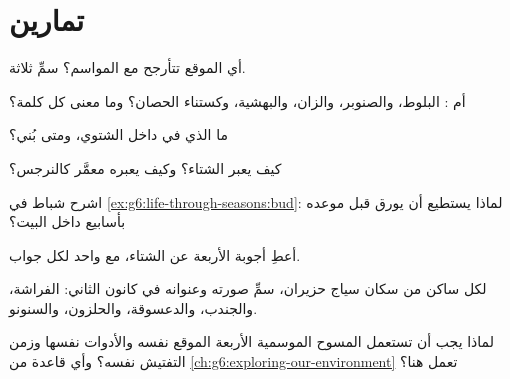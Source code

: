 \section{تمارين}

\begin{exercise}[$\star$]\label{exo:g6:life-through-seasons:1}
أي  الموقع تتأرجح مع المواسم؟ سمِّ ثلاثة.
\end{exercise}

\begin{exercise}[$\star$]\label{exo:g6:life-through-seasons:2}
 أم : البلوط، والصنوبر، والزان، والبهشية، وكستناء
الحصان؟ وما معنى كل كلمة؟
\end{exercise}

\begin{exercise}[$\star$]\label{exo:g6:life-through-seasons:3}
ما الذي في داخل  الشتوي، ومتى بُني؟
\end{exercise}

\begin{exercise}[$\star$]\label{exo:g6:life-through-seasons:4}
كيف يعبر  الشتاء؟ وكيف يعبره معمَّر كالنرجس؟
\end{exercise}

\begin{exercise}[$\star$]\label{exo:g6:life-through-seasons:5}
اشرح  شباط في \cref{ex:g6:life-through-seasons:bud}: لماذا
يستطيع أن يورق قبل موعده بأسابيع داخل البيت؟
\end{exercise}

\begin{exercise}[$\star$]\label{exo:g6:life-through-seasons:6}
أعطِ أجوبة  الأربعة عن الشتاء، مع  واحد لكل جواب.
\end{exercise}

\begin{exercise}[$\star\star$]\label{exo:g6:life-through-seasons:7}
لكل ساكن من سكان سياج حزيران، سمِّ صورته وعنوانه في كانون الثاني:
الفراشة، والجندب، والدعسوقة، والحلزون، والسنونو.
\end{exercise}

\begin{exercise}[$\star\star$]\label{exo:g6:life-through-seasons:8}
لماذا يجب أن تستعمل المسوح الموسمية الأربعة الموقع نفسه والأدوات
نفسها وزمن التفتيش نفسه؟ وأي قاعدة من
\cref{ch:g6:exploring-our-environment} تعمل هنا؟
\end{exercise}

